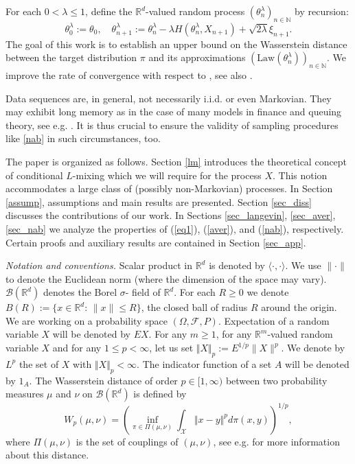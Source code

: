 \documentclass[a4paper]{article}
\begin{document}
For each $0<\lambda\leq 1$, define the $\mathbb{R}^{d}$-valued
random process $(\theta^{\lambda}_n)_{n\in\mathbb{N}}$ by recursion:
\begin{equation}\label{nab}
\theta^{\lambda}_0:=\theta_0,\quad \theta^{\lambda}_{n+1}:=\theta^{\lambda}_n-\lambda H(\theta^{\lambda}_n,X_{n+1})+\sqrt{2\lambda}\xi_{n+1}.
\end{equation}
The goal of this work is to establish an upper
bound on the Wasserstein distance between the target distribution $\pi$ and its approximations $(\mathrm{Law}(\theta^{\lambda}_n))_{n\in\mathbb{N}}$. %
We improve the rate of convergence with respect to \cite{raginsky}, see also \cite{xu}.

Data sequences are, in general, not necessarily i.i.d. or even Markovian.
They may exhibit long memory as in the case of many models
in finance and queuing theory, see e.g. \cite{taqqu,b}. It is thus crucial
to ensure the validity of sampling procedures like \eqref{nab} in
such circumstances, too.

The paper is organized as follows. Section \ref{lm} introduces the
theoretical concept of conditional $L$-mixing which we will require for the process
$X$. This notion accommodates a large class of (possibly non-Markovian) processes.
In Section \ref{assump}, assumptions and main results are presented. Section \ref{sec_diss} discusses the contributions of our work. In Sections \ref{sec_langevin}, \ref{sec_aver}, \ref{sec_nab} we analyze the properties of (\ref{eq1}), (\ref{aver}), and (\ref{nab}), respectively. Certain proofs and auxiliary results are contained in Section \ref{sec_app}.


\emph{Notation and conventions.} Scalar product in $\mathbb{R}^{d}$
is denoted by $\langle \cdot,\cdot\rangle$. We use $\| \cdot \|$ to denote
the Euclidean norm (where the dimension of the space may vary). $\mathcal{B}(\mathbb{R}^{d})$ denotes the Borel $\sigma$- field of $\mathbb{R}^{d}$. For each $R\geq 0$
we denote $B(R):=\{x\in\mathbb{R}^{d}:\, \|x\|\leq R\}$, the closed
ball of radius $R$ around the origin. We are working on a probability space $(\Omega,\mathcal{F},P)$.  Expectation of
a random variable $X$ will be denoted by $EX$.
For any $m\geq 1$, for any $\mathbb{R}^{{m}}$-valued random variable $X$ and for any $1\leq p<\infty$, let us set
$\Vert X\Vert_p:=E^{1/p}\|X\|^p$. We denote by $L^p$ the set of $X$ with $\Vert X\Vert_p<\infty$.
The indicator function of a set $A$ will be denoted by $1_A$.  The Wasserstein distance of order $p \in [1,\infty)$ between two probability measures $\mu$ and $\nu$ on $\mathcal{B}(\mathbb{R}^{d})$ is defined by
\begin{equation}\label{w_dist}
W_p(\mu,\nu) = \left( \inf_{\pi \in \Pi(\mu,\nu)} \int_{\mathcal{X}} \Vert x-y\Vert^p
d\pi(x,y)  \right)^{1/p},
\end{equation}
where $\Pi(\mu,\nu)$ is the set of couplings of $(\mu, \nu)$, see e.g. \cite{villani}
for more information about this distance.
\end{document}
